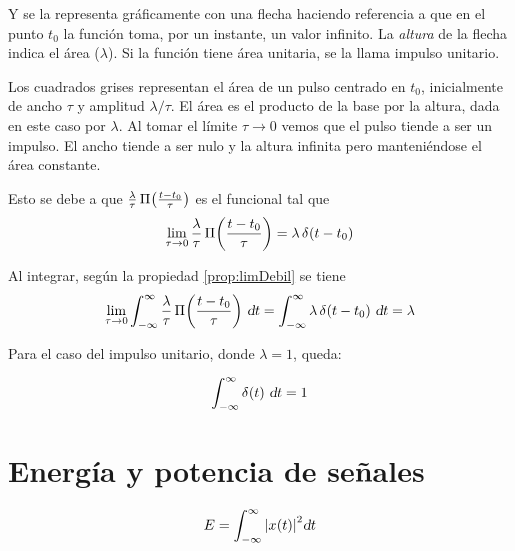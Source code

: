 Y se la representa gráficamente con una flecha haciendo referencia a que en el punto $t_0$ la función toma, por un instante, un valor infinito.
La \emph{altura} de la flecha indica el área ($\lambda$).
Si la función tiene área unitaria, se la llama impulso unitario.

\begin{center}
    \def\svgwidth{0.6\linewidth}
    
\end{center}

Los cuadrados grises representan el área de un pulso centrado en $t_0$, inicialmente de ancho $\tau$ y amplitud $\lambda / \tau$.
El área es el producto de la base por la altura, dada en este caso por $\lambda$.
Al tomar el límite $\tau \to 0$ vemos que el pulso tiende a ser un impulso.
El ancho tiende a ser nulo y la altura infinita pero manteniéndose el área constante.

Esto se debe a que $\frac{\lambda}{\tau} \, \pulse[t_0]{t}{\tau}$ es el funcional tal que
\begin{equation*}
    \lim_{\tau \to 0} \frac{\lambda}{\tau} \, \pulse[t_0]{t}{\tau} = \lambda \, \fx[\delta]{t-t_0}
\end{equation*}

Al integrar, según la propiedad \ref{prop:limDebil} se tiene
\begin{equation*}
    \lim_{\tau \to 0} \int_{-\infty}^\infty \frac{\lambda}{\tau} \, \pulse[t_0]{t}{\tau} \, \dif t
    = \int_{-\infty}^\infty \lambda \, \fx[\delta]{t-t_0} \, \dif t
    = \lambda
\end{equation*}

Para el caso del impulso unitario, donde $\lambda = 1$, queda:

\begin{mdframed}[style=PropertyFrame]
    \begin{prop}
    \end{prop}
    \begin{equation*}
        \int_{-\infty}^\infty \fx[\delta]{t} \, \dif t = 1
    \end{equation*}
\end{mdframed}

\section{Energía y potencia de señales}

\begin{mdframed}[style=PropertyFrame]
    \begin{defn}
    \end{defn}
    \begin{equation*}
        E = \int_{-\infty}^{\infty} \norm{\fx[x]{t}}^2 \dif t
    \end{equation*}
\end{mdframed}

